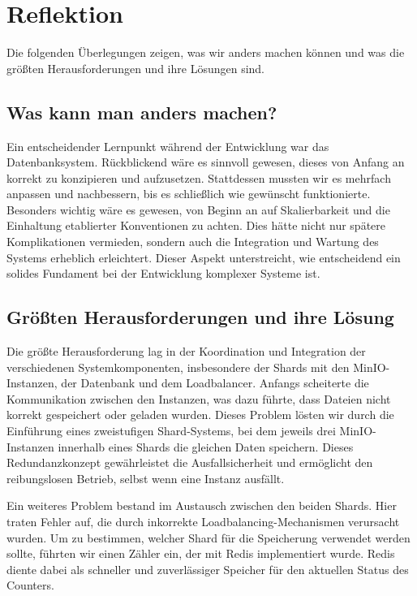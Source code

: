 \documentclass[12pt]{report}
\begin{document}
\chapter{Reflektion}
	Die folgenden Überlegungen zeigen, was wir anders machen können und was die größten Herausforderungen und ihre Lösungen sind.
	
	\section{Was kann man anders machen?}
	Ein entscheidender Lernpunkt während der Entwicklung war das Datenbanksystem. Rückblickend wäre es sinnvoll gewesen, dieses von Anfang an korrekt zu konzipieren und aufzusetzen. Stattdessen mussten wir es mehrfach anpassen und nachbessern, bis es schließlich wie gewünscht funktionierte. Besonders wichtig wäre es gewesen, von Beginn an auf Skalierbarkeit und die Einhaltung etablierter Konventionen zu achten. Dies hätte nicht nur spätere Komplikationen vermieden, sondern auch die Integration und Wartung des Systems erheblich erleichtert. Dieser Aspekt unterstreicht, wie entscheidend ein solides Fundament bei der Entwicklung komplexer Systeme ist.
	
	\section{Größten Herausforderungen und ihre Lösung}
	Die größte Herausforderung lag in der Koordination und Integration der verschiedenen Systemkomponenten, insbesondere der Shards mit den MinIO-Instanzen, der Datenbank und dem Loadbalancer. Anfangs scheiterte die Kommunikation zwischen den Instanzen, was dazu führte, dass Dateien nicht korrekt gespeichert oder geladen wurden. Dieses Problem lösten wir durch die Einführung eines zweistufigen Shard-Systems, bei dem jeweils drei MinIO-Instanzen innerhalb eines Shards die gleichen Daten speichern. Dieses Redundanzkonzept gewährleistet die Ausfallsicherheit und ermöglicht den reibungslosen Betrieb, selbst wenn eine Instanz ausfällt.
	
	Ein weiteres Problem bestand im Austausch zwischen den beiden Shards. Hier traten Fehler auf, die durch inkorrekte Loadbalancing-Mechanismen verursacht wurden. Um zu bestimmen, welcher Shard für die Speicherung verwendet werden sollte, führten wir einen Zähler ein, der mit Redis implementiert wurde. Redis diente dabei als schneller und zuverlässiger Speicher für den aktuellen Status des Counters.

\newpage
{}
\setcounter{page}{\value{frontmatterPage}} %
\addtocounter{page}{1}

\renewcommand{\refname}{Literaturverzeichnis}


\end{document}
